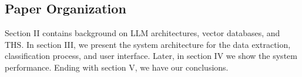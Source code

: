 \subsection{Paper Organization}
Section II contains background on LLM  architectures, vector databases, and THS. In section III, we present the system architecture for the data extraction, classification process, and user interface. Later, in section IV we show the system performance. Ending with section V, we have our conclusions. %
